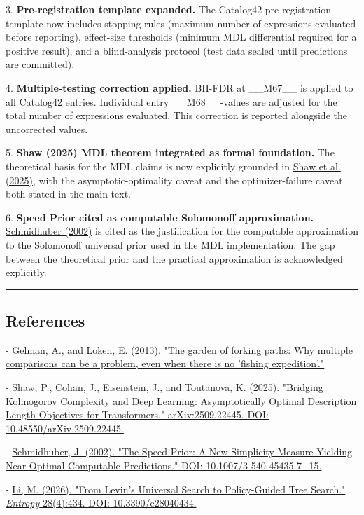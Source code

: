 3. \textbf{Pre-registration template expanded.} The Catalog42 pre-registration template now includes stopping rules (maximum number of expressions evaluated before reporting), effect-size thresholds (minimum MDL differential required for a positive result), and a blind-analysis protocol (test data sealed until predictions are committed).

4. \textbf{Multiple-testing correction applied.} BH-FDR at \_\_M67\_\_ is applied to all Catalog42 entries. Individual entry \_\_M68\_\_-values are adjusted for the total number of expressions evaluated. This correction is reported alongside the uncorrected values.

5. \textbf{Shaw (2025) MDL theorem integrated as formal foundation.} The theoretical basis for the MDL claims is now explicitly grounded in \href{https://arxiv.org/abs/2509.22445}{Shaw et al. (2025)}, with the asymptotic-optimality caveat and the optimizer-failure caveat both stated in the main text.

6. \textbf{Speed Prior cited as computable Solomonoff approximation.} \href{https://doi.org/10.1007/3-540-45435-7\_15}{Schmidhuber (2002)} is cited as the justification for the computable approximation to the Solomonoff universal prior used in the MDL implementation. The gap between the theoretical prior and the practical approximation is acknowledged explicitly.

\noindent\rule{\textwidth}{0.4pt}

\subsection{References}

- \href{https://sites.stat.columbia.edu/gelman/research/unpublished/forking.pdf}{Gelman, A., and Loken, E. (2013). "The garden of forking paths: Why multiple comparisons can be a problem, even when there is no 'fishing expedition'."}

- \href{https://arxiv.org/abs/2509.22445}{Shaw, P., Cohan, J., Eisenstein, J., and Toutanova, K. (2025). "Bridging Kolmogorov Complexity and Deep Learning: Asymptotically Optimal Description Length Objectives for Transformers." arXiv:2509.22445. DOI: 10.48550/arXiv.2509.22445.}

- \href{https://doi.org/10.1007/3-540-45435-7\_15}{Schmidhuber, J. (2002). "The Speed Prior: A New Simplicity Measure Yielding Near-Optimal Computable Predictions." DOI: 10.1007/3-540-45435-7\_15.}

- \href{https://doi.org/10.3390/e28040434}{Li, M. (2026). "From Levin's Universal Search to Policy-Guided Tree Search." \textit{Entropy} 28(4):434. DOI: 10.3390/e28040434.}

